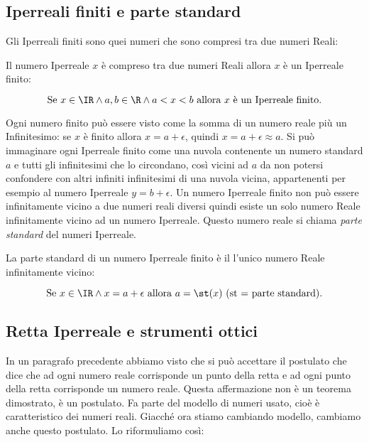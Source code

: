 \subsection{Iperreali finiti e parte standard}
\label{subsec:insnum_partestandard}

Gli Iperreali finiti sono quei numeri che sono compresi tra due numeri Reali:

\begin{definizione}
 Il numero Iperreale $x$ è compreso tra due numeri Reali allora $x$ è un 
Iperreale finito:

\[\text{Se } x \in \IR \wedge a, b \in \R \wedge 
  a < x < b \text{ allora } x \text{ è un Iperreale finito.}\]
\end{definizione}

Ogni numero finito può essere visto come la somma di un numero reale più un 
Infinitesimo: se $x$ è finito allora $x = a + \epsilon$, quindi 
$x=a+\epsilon\approx a$. Si può immaginare ogni Iperreale finito come una
nuvola contenente un numero standard $a$ e tutti gli infinitesimi che lo 
circondano, così vicini ad $a$ da non potersi confondere con altri infiniti
infinitesimi di una nuvola vicina, appartenenti per esempio al numero Iperreale
$y=b+\epsilon$. Un numero Iperreale finito non può essere infinitamente vicino 
a due numeri reali diversi quindi esiste un solo numero Reale infinitamente 
vicino ad un numero Iperreale. 
Questo numero reale si chiama \emph{parte standard} del numeri Iperreale.

\begin{definizione}
 La parte standard di un numero Iperreale finito è il l'unico numero Reale 
infinitamente vicino:

\[\text{Se } x \in \IR \wedge x= a+\epsilon \text{ allora } 
a= \st(x) \text{ (st = parte standard).}\]
\end{definizione}


\subsection{Retta Iperreale e strumenti ottici}
\label{subsec:insnum_retta}

In un paragrafo precedente abbiamo visto che si può accettare il postulato che 
dice che ad ogni numero reale corrisponde un punto della retta e ad ogni 
punto della retta corrisponde un numero reale. 
Questa affermazione non è un teorema dimostrato, è un postulato. Fa parte del modello
di numeri usato, cioè è caratteristico dei numeri reali. Giacché ora stiamo cambiando
modello, cambiamo anche questo postulato. Lo riformuliamo così:

